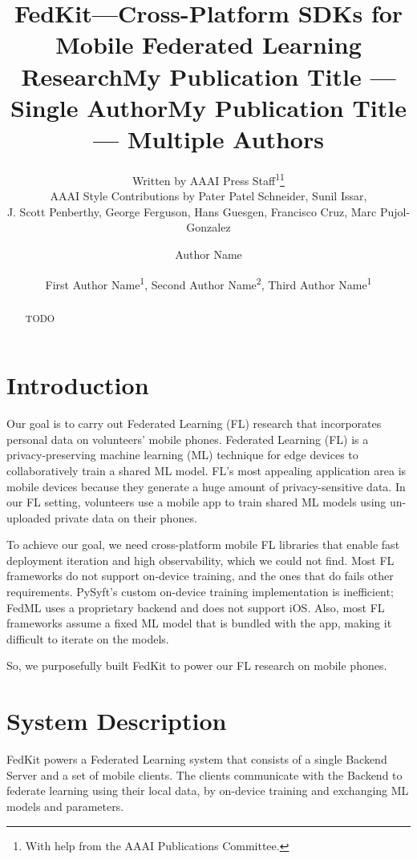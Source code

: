 \documentclass[letterpaper]{article} %
\title{FedKit---Cross-Platform SDKs for Mobile Federated Learning Research}
\author{
    Written by AAAI Press Staff\textsuperscript{\rm 1}\thanks{With help from the AAAI Publications Committee.}\\
    AAAI Style Contributions by Pater Patel Schneider,
    Sunil Issar,\\
    J. Scott Penberthy,
    George Ferguson,
    Hans Guesgen,
    Francisco Cruz\equalcontrib,
    Marc Pujol-Gonzalez\equalcontrib
}
\title{My Publication Title --- Single Author}
\author {
    Author Name
}
\title{My Publication Title --- Multiple Authors}
\author {
    First Author Name\textsuperscript{\rm 1},
    Second Author Name\textsuperscript{\rm 2},
    Third Author Name\textsuperscript{\rm 1}
}
\begin{document}
\maketitle

\begin{abstract}
    TODO
\end{abstract}

\section{Introduction}

Our goal is to carry out Federated Learning (FL) research that incorporates
personal data on volunteers' mobile phones.
Federated Learning (FL) is a privacy-preserving machine learning (ML) technique
for edge devices to collaboratively train a shared ML model.
FL's most appealing application area is mobile devices because
they generate a huge amount of privacy-sensitive data.
In our FL setting,
volunteers use a mobile app to train shared ML models
using un-uploaded private data on their phones.

To achieve our goal, we need cross-platform mobile FL libraries that
enable fast deployment iteration and high observability,
which we could not find.
Most FL frameworks do not support on-device training,
and the ones that do fails other requirements. %
PySyft's \cite{ryffel2018generic,Ziller2021,hall2021syft}
custom on-device training implementation is inefficient;
FedML \cite{he2020fedml} uses a proprietary backend and does not support iOS.
Also, most FL frameworks assume a fixed ML model that is bundled with the app,
making it difficult to iterate on the models.

So, we purposefully built FedKit to power our FL research on mobile phones.

\section{System Description}

\newcommand{\model}{$M$}
\newcommand{\fs}{$S_\mathrm F$}

FedKit powers a Federated Learning system that
consists of a single Backend Server and a set of mobile clients.
The clients communicate with the Backend to federate learning
using their local data,
by on-device training and exchanging ML models and parameters.
\end{document}
